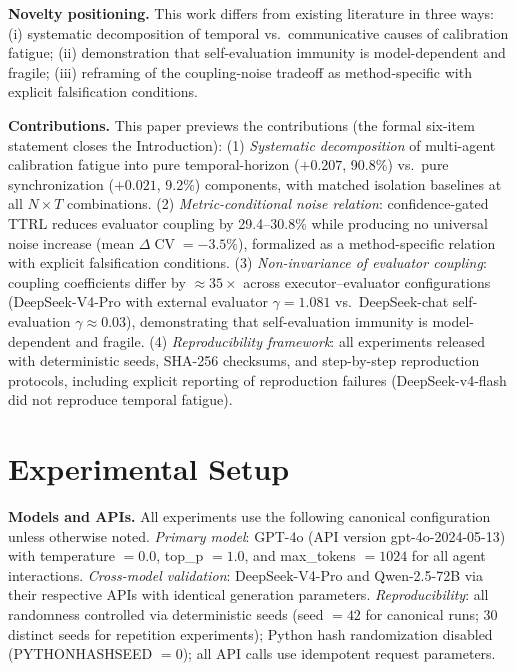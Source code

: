 \documentclass[11pt]{article}
\DeclareMathOperator{\CV}{CV}
\begin{document}
\textbf{Novelty positioning.} This work differs from existing literature in three ways: (i) systematic decomposition of temporal vs.\ communicative causes of calibration fatigue; (ii) demonstration that self-evaluation immunity is model-dependent and fragile; (iii) reframing of the coupling-noise tradeoff as method-specific with explicit falsification conditions.



	\textbf{Contributions.} This paper previews the contributions (the formal six-item statement closes the Introduction): (1) \emph{Systematic decomposition} of multi-agent calibration fatigue into pure temporal-horizon ($+0.207$, 90.8\%) vs.\ pure synchronization ($+0.021$, 9.2\%) components, with matched isolation baselines at all $N{\times}T$ combinations. (2) \emph{Metric-conditional noise relation}: confidence-gated TTRL reduces evaluator coupling by 29.4--30.8\% while producing no universal noise increase (mean $\Delta\CV=-3.5\%$), formalized as a method-specific relation with explicit falsification conditions. (3) \emph{Non-invariance of evaluator coupling}: coupling coefficients differ by $\approx 35\times$ across executor--evaluator configurations (DeepSeek-V4-Pro with external evaluator $\gamma=1.081$ vs.\ DeepSeek-chat self-evaluation $\gamma\approx 0.03$), demonstrating that self-evaluation immunity is model-dependent and fragile. (4) \emph{Reproducibility framework}: all experiments released with deterministic seeds, SHA-256 checksums, and step-by-step reproduction protocols, including explicit reporting of reproduction failures (DeepSeek-v4-flash did not reproduce temporal fatigue).\section{Experimental Setup}
\label{sec:experimental-setup}

\textbf{Models and APIs.} All experiments use the following canonical configuration unless otherwise noted. \textit{Primary model}: GPT-4o (API version gpt-4o-2024-05-13) with temperature $=0.0$, top\_p $=1.0$, and max\_tokens $=1024$ for all agent interactions. \textit{Cross-model validation}: DeepSeek-V4-Pro and Qwen-2.5-72B via their respective APIs with identical generation parameters. \textit{Reproducibility}: all randomness controlled via deterministic seeds (seed $=42$ for canonical runs; 30 distinct seeds for repetition experiments); Python hash randomization disabled (PYTHONHASHSEED $=0$); all API calls use idempotent request parameters.
\end{document}
